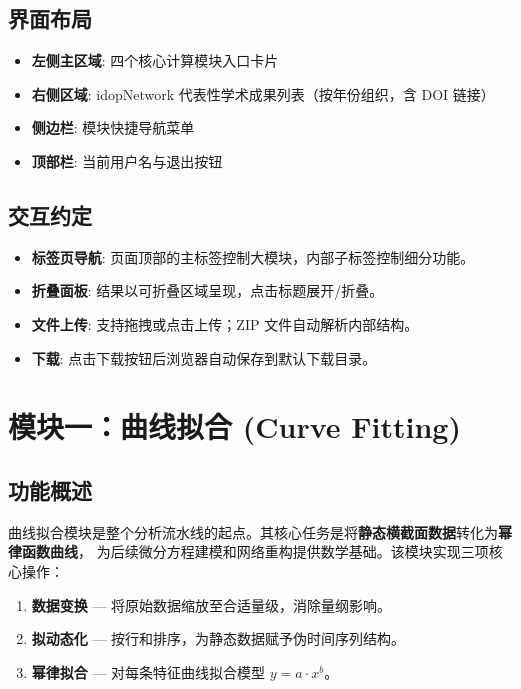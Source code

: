 \documentclass[12pt,a4paper]{ctexart}
\begin{document}
\subsection{界面布局}

\begin{itemize}[leftmargin=*]
    \item \textbf{左侧主区域}: 四个核心计算模块入口卡片
    \item \textbf{右侧区域}: idopNetwork 代表性学术成果列表（按年份组织，含 DOI 链接）
    \item \textbf{侧边栏}: 模块快捷导航菜单
    \item \textbf{顶部栏}: 当前用户名与退出按钮
\end{itemize}

\subsection{交互约定}

\begin{itemize}[leftmargin=*]
    \item \textbf{标签页导航}: 页面顶部的主标签控制大模块，内部子标签控制细分功能。
    \item \textbf{折叠面板}: 结果以可折叠区域呈现，点击标题展开/折叠。
    \item \textbf{文件上传}: 支持拖拽或点击上传；ZIP 文件自动解析内部结构。
    \item \textbf{下载}: 点击下载按钮后浏览器自动保存到默认下载目录。
\end{itemize}

\section{模块一：曲线拟合 (Curve Fitting)}

\subsection{功能概述}

曲线拟合模块是整个分析流水线的起点。其核心任务是将\textbf{静态横截面数据}转化为\textbf{幂律函数曲线}，
为后续微分方程建模和网络重构提供数学基础。该模块实现三项核心操作：

\begin{enumerate}[leftmargin=*]
    \item \textbf{数据变换} --- 将原始数据缩放至合适量级，消除量纲影响。
    \item \textbf{拟动态化} --- 按行和排序，为静态数据赋予伪时间序列结构。
    \item \textbf{幂律拟合} --- 对每条特征曲线拟合模型 $y = a \cdot x^b$。
\end{enumerate}
\end{document}
